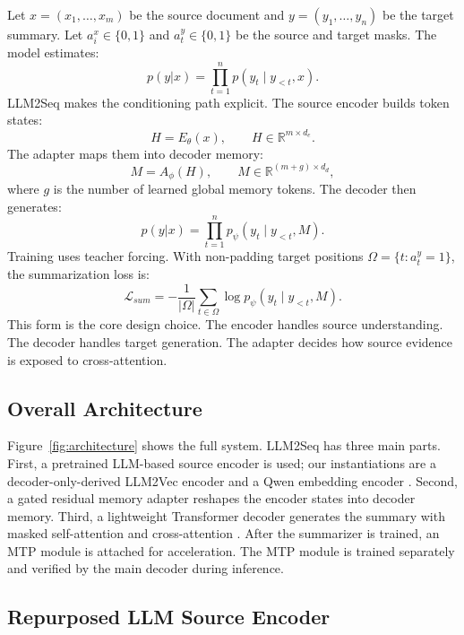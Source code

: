 \documentclass[11pt]{article}
\begin{document}
Let $x=(x_1,\ldots,x_m)$ be the source document and $y=(y_1,\ldots,y_n)$ be the target summary.
Let $a^x_i\in\{0,1\}$ and $a^y_t\in\{0,1\}$ be the source and target masks.
The model estimates:
\begin{equation}
p(y|x)=\prod_{t=1}^{n}p(y_t \mid y_{<t},x).
\end{equation}
LLM2Seq makes the conditioning path explicit.
The source encoder builds token states:
\begin{equation}
H=E_{\theta}(x), \qquad H \in \mathbb{R}^{m \times d_e}.
\end{equation}
The adapter maps them into decoder memory:
\begin{equation}
M=A_{\phi}(H), \qquad M \in \mathbb{R}^{(m+g) \times d_d},
\end{equation}
where $g$ is the number of learned global memory tokens.
The decoder then generates:
\begin{equation}
p(y|x)=\prod_{t=1}^{n}p_{\psi}(y_t \mid y_{<t},M).
\end{equation}
Training uses teacher forcing.
With non-padding target positions $\Omega=\{t:a^y_t=1\}$, the summarization loss is:
\begin{equation}
\mathcal{L}_{sum}
=-\frac{1}{|\Omega|}\sum_{t\in\Omega}
\log p_{\psi}(y_t\mid y_{<t},M).
\end{equation}
This form is the core design choice.
The encoder handles source understanding.
The decoder handles target generation.
The adapter decides how source evidence is exposed to cross-attention.

\subsection{Overall Architecture}

Figure~\ref{fig:architecture} shows the full system.
LLM2Seq has three main parts.
First, a pretrained LLM-based source encoder is used; our instantiations are a decoder-only-derived LLM2Vec encoder and a Qwen embedding encoder \citep{behnamghader2024llm2vec,zhang2025qwen3embedding}.
Second, a gated residual memory adapter reshapes the encoder states into decoder memory.
Third, a lightweight Transformer decoder generates the summary with masked self-attention and cross-attention \citep{vaswani2017attention}.
After the summarizer is trained, an MTP module is attached for acceleration.
The MTP module is trained separately and verified by the main decoder during inference.

\subsection{Repurposed LLM Source Encoder}
\end{document}
